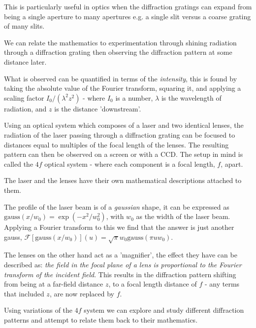 \documentclass[twocolumn]{revtex4}
\begin{document}
This is particularly useful in optics when the diffraction gratings can expand from being a single aperture to many apertures e.g. a single slit versus a coarse grating of many slits.

We can relate the mathematics to experimentation through shining radiation through a diffraction grating then observing the diffraction pattern at some distance later. 

What is observed can be quantified in terms of the \textit{intensity}, this is found by taking the absolute value of the Fourier transform, squaring it, and applying a scaling factor $I_0/(\lambda^2z^2)$ - where $I_0$ is a number, $\lambda$ is the wavelength of radiation, and $z$ is the distance 'downstream'.

Using an optical system which composes of a laser and two identical lenses, the radiation of the laser passing through a diffraction grating can be focused to distances equal to multiples of the focal length of the lenses. The resulting pattern can then be observed on a screen or with a CCD. The setup in mind is called the $4f$ optical system - where each component is a focal length, $f$, apart.

The laser and the lenses have their own mathematical descriptions attached to them.

The profile of the laser beam is of a \textit{gaussian} shape, it can be expressed as $\text{gauss}(x/w_0)=\exp{(-x^2/w_0^2)}$, with $w_0$ as the width of the laser beam. Applying a Fourier transform to this we find that the answer is just another gauss, $\mathcal{F}[\text{gauss}(x/w_0)](u)=\sqrt{\pi}w_0\text{gauss}(\pi u w_0)$.

The lenses on the other hand act as a 'magnifier', the effect they have can be described as: \textit{the field in the focal plane of a lens is proportional to the Fourier transform of the incident field}. This results in the diffraction pattern shifting from being at a far-field distance $z$, to a focal length distance of $f$ - any terms that included $z$, are now replaced by $f$.

Using variations of the $4f$ system we can explore and study different diffraction patterns and attempt to relate them back to their mathematics.

\vspace{-3ex}
\end{document}
